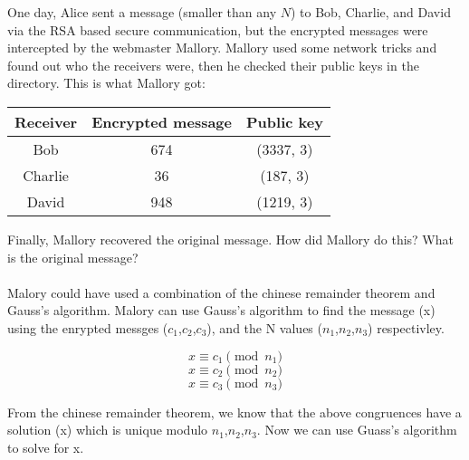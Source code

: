\documentclass{article}
\begin{document}
\noindent One day, Alice sent a message (smaller than any $N$) to Bob,
Charlie, and David via the RSA based secure communication, but the
encrypted messages were intercepted by the webmaster Mallory. Mallory
used some network tricks and found out who the receivers were, then he
checked their public keys in the directory. This is what Mallory got:

\begin{center}
  \begin{tabular}{ | c | c | c | }
    \hline
    Receiver & Encrypted message & Public key \\ \hline
    Bob & 674 & (3337, 3) \\
    Charlie & 36 & (187, 3) \\
    David & 948 & (1219, 3) \\
    \hline
  \end{tabular}
\end{center}

\noindent Finally, Mallory recovered the original message. How did
Mallory do this? What is the original message?\\

\\
 Malory could have used a combination of
the chinese remainder theorem and Gauss's algorithm. Malory can use Gauss's
algorithm to find the message (x) using the enrypted messges ($c_1$,$c_2$,$c_3$),
and the N values ($n_1$,$n_2$,$n_3$) respectivley.

$$x \equiv c_1 \pmod{n_1}$$
$$x \equiv c_2 \pmod{n_2}$$
$$x \equiv c_3 \pmod{n_3}$$

\noindent From the chinese remainder theorem, we know that the above congruences
have a solution (x) which is unique modulo $n_1$,$n_2$,$n_3$. Now we can use Guass's
algorithm to solve for x.\\
\end{document}
